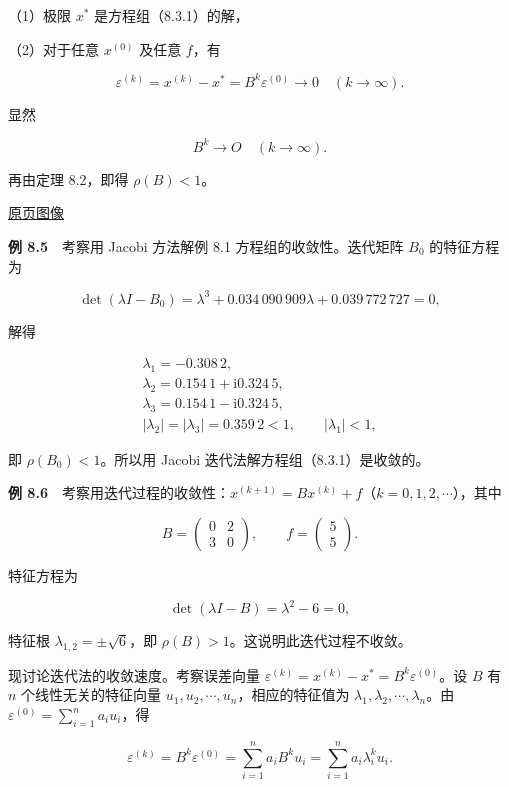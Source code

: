 \documentclass[
  10pt,
  fontset=fandol]{ctexart}
\begin{document}
（1）极限 \(x^*\) 是方程组（8.3.1）的解，

（2）对于任意 \(x^{(0)}\) 及任意 \(f\)，有

\[
\varepsilon^{(k)}=x^{(k)}-x^*=B^k\varepsilon^{(0)}\to0\quad(k\to\infty).
\]

显然

\[
B^k\to O\quad(k\to\infty).
\]

再由定理 8.2，即得 \(\rho(B)<1\)。

\href{../../source-images/pdf-222.jpeg}{原页图像}

\textbf{例 8.5}　考察用 Jacobi 方法解例 8.1 方程组的收敛性。迭代矩阵 \(B_0\) 的特征方程为

\[
\det(\lambda I-B_0)=\lambda^3+0.034\,090\,909\lambda+0.039\,772\,727=0,
\]

解得

\[
\begin{gathered}
\lambda_1=-0.308\,2,\\
\lambda_2=0.154\,1+\mathrm i0.324\,5,\\
\lambda_3=0.154\,1-\mathrm i0.324\,5,\\
|\lambda_2|=|\lambda_3|=0.359\,2<1,\qquad|\lambda_1|<1,
\end{gathered}
\]

即 \(\rho(B_0)<1\)。所以用 Jacobi 迭代法解方程组（8.3.1）是收敛的。

\textbf{例 8.6}　考察用迭代过程的收敛性：\(x^{(k+1)}=Bx^{(k)}+f\)（\(k=0,1,2,\cdots\)），其中

\[
B=\begin{pmatrix}0&2\\3&0\end{pmatrix},\qquad f=\begin{pmatrix}5\\5\end{pmatrix}.
\]

特征方程为

\[
\det(\lambda I-B)=\lambda^2-6=0,
\]

特征根 \(\lambda_{1,2}=\pm\sqrt6\)，即 \(\rho(B)>1\)。这说明此迭代过程不收敛。

现讨论迭代法的收敛速度。考察误差向量 \(\varepsilon^{(k)}=x^{(k)}-x^*=B^k\varepsilon^{(0)}\)。设 \(B\) 有 \(n\) 个线性无关的特征向量 \(u_1,u_2,\cdots,u_n\)，相应的特征值为 \(\lambda_1,\lambda_2,\cdots,\lambda_n\)。由 \(\varepsilon^{(0)}=\sum\limits_{i=1}^n a_i u_i\)，得

\[
\varepsilon^{(k)}=B^k\varepsilon^{(0)}=\sum_{i=1}^n a_i B^k u_i=\sum_{i=1}^n a_i\lambda_i^k u_i.
\]
\end{document}
